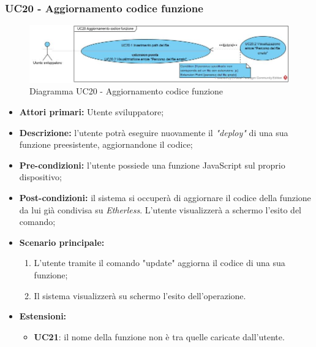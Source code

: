 \subsubsection{UC20 - Aggiornamento codice funzione}
\begin{figure}[h]
	\centering
	\includegraphics[width=\linewidth]{res/img/UC20.jpg}
	\caption{Diagramma UC20 - Aggiornamento codice funzione}
\end{figure}
\begin{itemize}
	\item \textbf{Attori primari:} Utente sviluppatore;
	\item \textbf{Descrizione:} l'utente potrà eseguire nuovamente il \textit{"deploy\glos"} di una sua funzione preesistente, aggiornandone il codice;
	\item \textbf{Pre-condizioni:} l'utente possiede una funzione JavaScript sul proprio dispositivo;
	\item \textbf{Post-condizioni:} il sistema si occuperà di aggiornare il codice della funzione da lui già condivisa su \textit{Etherless}. L'utente visualizzerà a schermo l'esito del comando;
	\item \textbf{Scenario principale:}
	\begin{enumerate}
		\item L'utente tramite il comando "update" aggiorna il codice di una sua funzione;
		\item Il sistema visualizzerà su schermo l'esito dell'operazione.
	\end{enumerate}
	\item\textbf{Estensioni:}
	\begin{itemize}
		\item \textbf{UC21}: il nome della funzione non è tra quelle caricate dall'utente.
	\end{itemize}
\end{itemize}
